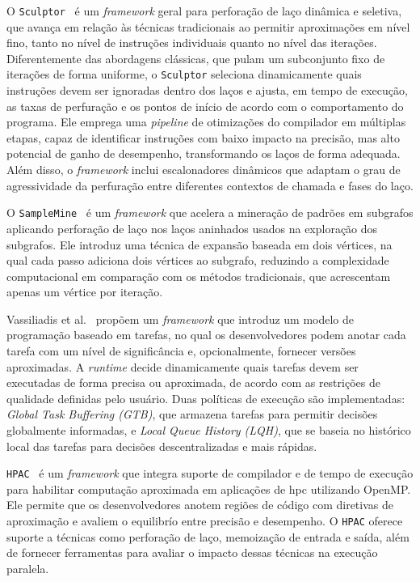 O \texttt{Sculptor}~\cite{li2018} é um \textit{framework} geral para perforação de laço dinâmica e seletiva, que avança em relação às técnicas tradicionais ao permitir aproximações em nível fino, tanto no nível de instruções individuais quanto no nível das iterações. Diferentemente das abordagens clássicas, que pulam um subconjunto fixo de iterações de forma uniforme, o \texttt{Sculptor} seleciona dinamicamente quais instruções devem ser ignoradas dentro dos laços e ajusta, em tempo de execução, as taxas de perfuração e os pontos de início de acordo com o comportamento do programa. Ele emprega uma \textit{pipeline} de otimizações do compilador em múltiplas etapas, capaz de identificar instruções com baixo impacto na precisão, mas alto potencial de ganho de desempenho, transformando os laços de forma adequada. Além disso, o \textit{framework} inclui escalonadores dinâmicos que adaptam o grau de agressividade da perfuração entre diferentes contextos de chamada e fases do laço.

O \texttt{SampleMine}~\cite{jiang2022} é um \textit{framework} que acelera a mineração de padrões em subgrafos aplicando perforação de laço nos laços aninhados usados na exploração dos subgrafos. Ele introduz uma técnica de expansão baseada em dois vértices, na qual cada passo adiciona dois vértices ao subgrafo, reduzindo a complexidade computacional em comparação com os métodos tradicionais, que acrescentam apenas um vértice por iteração.

Vassiliadis et al.~\cite{vassiliadis2015} propõem um \textit{framework} que introduz um modelo de programação baseado em tarefas, no qual os desenvolvedores podem anotar cada tarefa com um nível de significância e, opcionalmente, fornecer versões aproximadas. A \textit{runtime} decide dinamicamente quais tarefas devem ser executadas de forma precisa ou aproximada, de acordo com as restrições de qualidade definidas pelo usuário. Duas políticas de execução são implementadas: \textit{Global Task Buffering (GTB)}, que armazena tarefas para permitir decisões globalmente informadas, e \textit{Local Queue History (LQH)}, que se baseia no histórico local das tarefas para decisões descentralizadas e mais rápidas.

\texttt{HPAC}~\cite{parasyris2021} é um \textit{framework} que integra suporte de compilador e de tempo de execução para habilitar computação aproximada em aplicações de \gls{hpc} utilizando OpenMP. Ele permite que os desenvolvedores anotem regiões de código com diretivas de aproximação e avaliem o equilibrío entre precisão e desempenho. O \texttt{HPAC} oferece suporte a técnicas como perforação de laço, memoização de entrada e saída, além de fornecer ferramentas para avaliar o impacto dessas técnicas na execução paralela.
